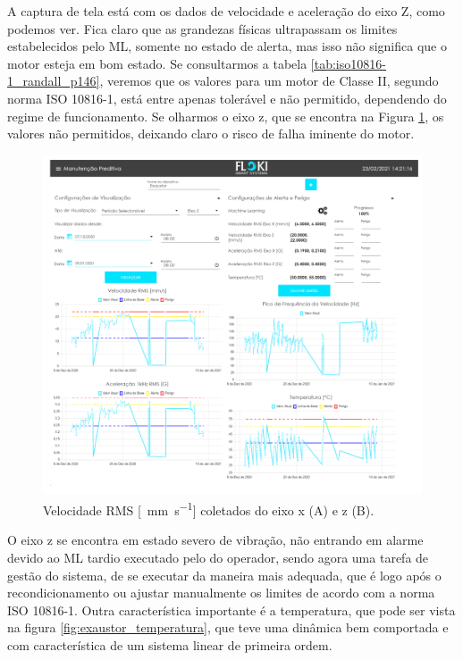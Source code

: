 A captura de tela está com os dados de velocidade e aceleração do eixo Z, como podemos ver. Fica claro que as grandezas físicas
ultrapassam os limites estabelecidos pelo ML, somente no estado de alerta, mas isso não significa que o motor esteja em bom estado.
Se consultarmos a tabela \ref{tab:iso10816-1_randall_p146}, veremos que os valores para um motor de Classe II, segundo norma  ISO 10816-1, está 
entre apenas tolerável e não permitido, dependendo do regime de funcionamento. 
Se olharmos o eixo z, que se encontra na Figura \ref{fig:exaustor_xz}, os valores não permitidos, deixando claro o risco de falha iminente do 
motor.

\begin{figure}[H]
    \caption{Velocidade RMS [\SI{}{\milli\metre\per\second}] coletados do eixo x (A) e z (B).}
    \begin{center}
        \includegraphics[scale=0.65, page=2]{resultados/img/resultados.pdf}
    \end{center}
    \label{fig:exaustor_xz}
\end{figure}

O eixo z se encontra em estado severo de vibração, não entrando em alarme devido ao ML tardio executado
pelo do operador, sendo agora uma tarefa de gestão do sistema, de se executar da maneira mais adequada, que é logo após o recondicionamento 
ou ajustar manualmente os limites de acordo com a norma ISO 10816-1. Outra característica importante é a temperatura, que pode ser vista na 
figura \ref{fig:exaustor_temperatura}, que teve uma dinâmica bem comportada e com característica de um sistema linear de primeira ordem.


